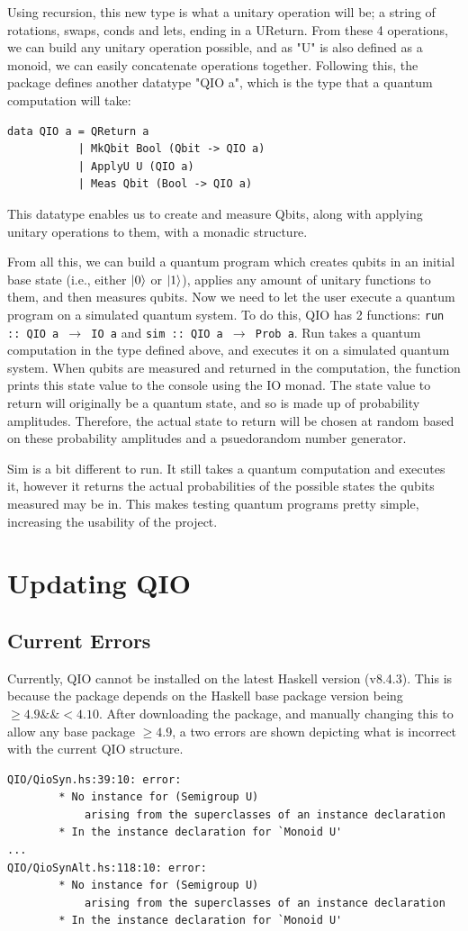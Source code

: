 \documentclass[a4paper,11pt, titlepage, twoside]{article}
\begin{document}
Using recursion, this new type is what a unitary operation will be; a string of rotations, swaps, conds and lets, ending in a UReturn. From these 4 operations, we can build any unitary operation possible, and as "U" is also defined as a monoid, we can easily concatenate operations together. Following this, the package defines another datatype "QIO a", which is the type that a quantum computation will take:
\begin{verbatim}
data QIO a = QReturn a 
           | MkQbit Bool (Qbit -> QIO a) 
           | ApplyU U (QIO a) 
           | Meas Qbit (Bool -> QIO a)
\end{verbatim}
This datatype enables us to create and measure Qbits, along with applying unitary operations to them, with a monadic structure.\par
From all this, we can build a quantum program which creates qubits in an initial base state (i.e., either $\ket{0}$ or $\ket{1}$), applies any amount of unitary functions to them, and then measures qubits. Now we need to let the user execute a quantum program on a simulated quantum system. To do this, QIO has 2 functions: \texttt{run :: QIO a $\to$ IO a} and \texttt{sim :: QIO a $\to$ Prob a}. Run takes a quantum computation in the type defined above, and executes it on a simulated quantum system. When qubits are measured and returned in the computation, the function prints this state value to the console using the IO monad. The state value to return will originally be a quantum state, and so is made up of probability amplitudes. Therefore, the actual state to return will be chosen at random based on these probability amplitudes and a psuedorandom number generator.\par
Sim is a bit different to run. It still takes a quantum computation and executes it, however it returns the actual probabilities of the possible states the qubits measured may be in. This makes testing quantum programs pretty simple, increasing the usability of the project. 

\section{Updating QIO}
\subsection{Current Errors}
Currently, QIO cannot be installed on the latest Haskell version (v8.4.3). This is because the package depends on the Haskell base package version being $\geq 4.9 \&\& < 4.10$. After downloading the package, and manually changing this to allow any base package $\geq 4.9$, a two errors are shown depicting what is incorrect with the current QIO structure.\par
\begin{verbatim}
QIO/QioSyn.hs:39:10: error:
        * No instance for (Semigroup U)
            arising from the superclasses of an instance declaration
        * In the instance declaration for `Monoid U'
...
QIO/QioSynAlt.hs:118:10: error:
        * No instance for (Semigroup U)
            arising from the superclasses of an instance declaration
        * In the instance declaration for `Monoid U'
\end{verbatim}
\end{document}
